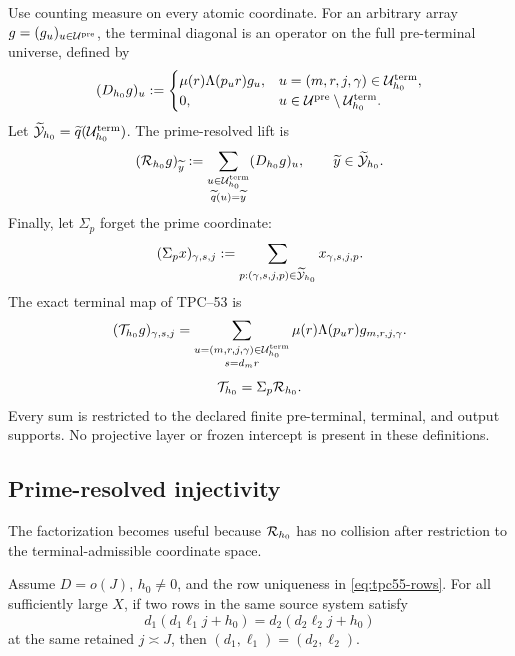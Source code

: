 Use counting measure on every atomic coordinate.  For an arbitrary array
\(g=(g_u)_{u\in\mathcal U^{\rm pre}}\), the terminal diagonal is an operator on
the full pre-terminal universe, defined by
\begin{equation}
 (D_{h_0}g)_u
 :=
 \begin{cases}
  \mu(r)\Lambda(p_ur)g_u,
   &u=(m,r,j,\gamma)\in\mathcal U_{h_0}^{\rm term},\\
  0,&u\in\mathcal U^{\rm pre}\setminus\mathcal U_{h_0}^{\rm term}.
 \end{cases}
 \label{eq:tpc55-terminal-diagonal}
\end{equation}
Let \(\widetilde{\mathcal Y}_{h_0}=\widetilde q(\mathcal U_{h_0}^{\rm term})\).  The
prime-resolved lift is
\begin{equation}
 (\mathcal R_{h_0}g)_{\widetilde y}
 :=\sum_{\substack{u\in\mathcal U_{h_0}^{\rm term}\\
                    \widetilde q(u)=\widetilde y}}
       (D_{h_0}g)_u,
 \qquad \widetilde y\in\widetilde{\mathcal Y}_{h_0}.
 \label{eq:tpc55-prime-resolved-lift}
\end{equation}
Finally, let \(\Sigma_p\) forget the prime coordinate:
\begin{equation}
 (\Sigma_p x)_{\gamma,s,j}
 :=\sum_{p:(\gamma,s,j,p)\in\widetilde{\mathcal Y}_{h_0}}
 x_{\gamma,s,j,p}.
 \label{eq:tpc55-forget-prime}
\end{equation}
The exact terminal map of TPC--53 is
 \begin{equation}
  (\mathcal T_{h_0}g)_{\gamma,s,j}
  =\sum_{\substack{u=(m,r,j,\gamma)\in\mathcal U_{h_0}^{\rm term}\\
                    s=d_mr}}
    \mu(r)\Lambda(p_ur)g_{m,r,j,\gamma}.
  \label{eq:tpc55-literal-terminal-map}
 \end{equation}
 \begin{equation}
  \mathcal T_{h_0}=\Sigma_p\mathcal R_{h_0}.
  \label{eq:tpc55-terminal-factorization}
 \end{equation}
Every sum is restricted to the declared finite pre-terminal, terminal,
and output supports.  No projective layer or frozen intercept is present
in these definitions.

\subsection{Prime-resolved injectivity}

The factorization becomes useful because \(\mathcal R_{h_0}\) has no collision
after restriction to the terminal-admissible coordinate space.

\begin{lemma}
\label{lem:tpc55-fused-injectivity}
Assume \(D=o(J)\), \(h_0\ne0\), and the row uniqueness in
\eqref{eq:tpc55-rows}.  For all sufficiently large \(X\), if two rows in
the same source system satisfy
\begin{equation}
 d_1(d_1\ell_1j+h_0)=d_2(d_2\ell_2j+h_0)
 \label{eq:tpc55-fused-label-equality}
\end{equation}
at the same retained \(j\asymp J\), then
\((d_1,\ell_1)=(d_2,\ell_2)\).
\end{lemma}

